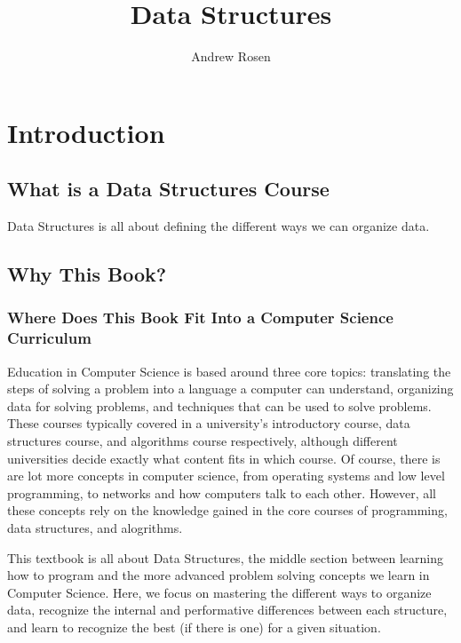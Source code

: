 \documentclass[10pt,a4paper]{book}
\begin{document}
\title{Data Structures}
\author{Andrew Rosen}
\date{}
\maketitle
\tableofcontents




\chapter{Introduction}

\section{What is a Data Structures Course}
Data Structures is all about defining the different ways we can organize data.


\section{Why This Book?}

\subsection{Where Does This Book Fit Into a Computer Science Curriculum }

Education in Computer Science is based around three core topics: translating the steps of solving a problem into a language a computer can understand, organizing data for solving problems, and techniques that can be used to solve problems. %
These courses typically covered in a university's introductory course, data structures course, and algorithms course respectively, although different universities decide exactly what content fits in which course.
Of course, there is are lot more concepts in computer science, from operating systems and low level programming,  to networks and how computers talk to each other. However, all these concepts rely on the knowledge gained in the core courses of programming, data structures, and alogrithms.

 

This textbook is all about Data Structures, the middle section between learning how to program and the more advanced problem solving concepts we learn in Computer Science. 
Here, we focus on mastering the different ways to organize data, recognize the internal and performative differences between each structure, and learn to recognize the best (if there is one) for a given situation.
\end{document}
